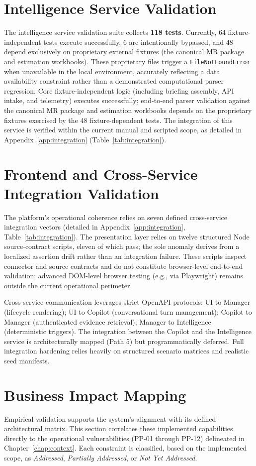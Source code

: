 \section{Intelligence Service Validation}
The intelligence service validation suite collects \textbf{118 tests}. Currently, 64 fixture-independent tests execute successfully, 6 are intentionally bypassed, and 48 depend exclusively on proprietary external fixtures (the canonical MR package and estimation workbooks). These proprietary files trigger a \texttt{FileNotFoundError} when unavailable in the local environment, accurately reflecting a data availability constraint rather than a demonstrated computational parser regression. Core fixture-independent logic (including briefing assembly, API intake, and telemetry) executes successfully; end-to-end parser validation against the canonical MR package and estimation workbooks depends on the proprietary fixtures exercised by the 48 fixture-dependent tests. The integration of this service is verified within the current manual and scripted scope, as detailed in Appendix~\ref{app:integration} (Table~\ref{tab:integration}).

\section{Frontend and Cross-Service Integration Validation}
The platform's operational coherence relies on seven defined cross-service integration vectors (detailed in Appendix~\ref{app:integration}, Table~\ref{tab:integration}). The presentation layer relies on twelve structured Node source-contract scripts, eleven of which pass; the sole anomaly derives from a localized assertion drift rather than an integration failure. These scripts inspect connector and source contracts and do not constitute browser-level end-to-end validation; advanced DOM-level browser testing (e.g., via Playwright) remains outside the current operational perimeter.

Cross-service communication leverages strict OpenAPI protocols: UI to Manager (lifecycle rendering); UI to Copilot (conversational turn management); Copilot to Manager (authenticated evidence retrieval); Manager to Intelligence (deterministic triggers). The integration between the Copilot and the Intelligence service is architecturally mapped (Path 5) but programmatically deferred. Full integration hardening relies heavily on structured scenario matrices and realistic seed manifests.

\section{Business Impact Mapping}\label{sec:business_impact}
Empirical validation supports the system's alignment with its defined architectural matrix. This section correlates these implemented capabilities directly to the operational vulnerabilities (PP-01 through PP-12) delineated in Chapter~\ref{chap:context}. Each constraint is classified, based on the implemented scope, as \textit{Addressed}, \textit{Partially Addressed}, or \textit{Not Yet Addressed}.

